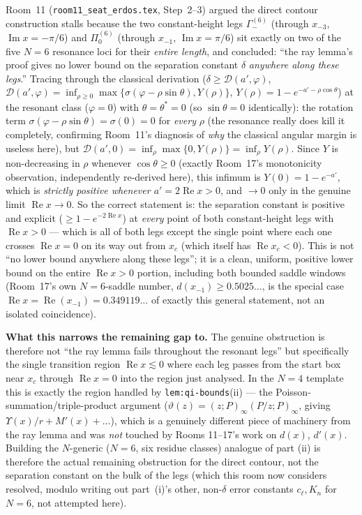 \documentclass[11pt]{article}
\begin{document}
Room~11 (\texttt{room11\_seat\_erdos.tex}, Step~2--3) argued the direct contour construction stalls
because the two constant-height legs $\Gamma_-^{(6)}$ (through $x_{-3}$, $\operatorname{Im}x=
-\pi/6$) and $\Pi_0^{(6)}$ (through $x_{-1}$, $\operatorname{Im}x=\pi/6$) sit exactly on two of the
five $N=6$ resonance loci for their \emph{entire length}, and concluded: ``the ray lemma's proof
gives no lower bound on the separation constant $\delta$ \emph{anywhere along these legs}.'' Tracing
through the classical derivation ($\delta\ge\mathcal D(a',\varphi)$, $\mathcal
D(a',\varphi)=\inf_{\rho\ge0}\max\{\sigma(\varphi-\rho\sin\theta),Y(\rho)\}$,
$Y(\rho)=1-e^{-a'-\rho\cos\theta}$) at the resonant class ($\varphi=0$) with $\theta=\theta^\ast=0$
(so $\sin\theta=0$ identically): the rotation term $\sigma(\varphi-\rho\sin\theta)=\sigma(0)=0$ for
\emph{every} $\rho$ (the resonance really does kill it completely, confirming Room~11's diagnosis of
\emph{why} the classical angular margin is useless here), but $\mathcal D(a',0)=\inf_\rho\max\{0,
Y(\rho)\}=\inf_\rho Y(\rho)$. Since $Y$ is non-decreasing in $\rho$ whenever $\cos\theta\ge0$
(exactly Room~17's monotonicity observation, independently re-derived here), this infimum is
$Y(0)=1-e^{-a'}$, which is \emph{strictly positive whenever $a'=2\operatorname{Re}x>0$}, and $\to0$
only in the genuine limit $\operatorname{Re}x\to0$. So the correct statement is: the separation
constant is positive and explicit ($\ge1-e^{-2\operatorname{Re}x}$) at \emph{every} point of both
constant-height legs with $\operatorname{Re}x>0$ --- which is all of both legs except the single
point where each one crosses $\operatorname{Re}x=0$ on its way out from $x_c$ (which itself has
$\operatorname{Re}x_c<0$). This is not ``no lower bound anywhere along these legs''; it is a clean,
uniform, positive lower bound on the entire $\operatorname{Re}x>0$ portion, including both bounded
saddle windows (Room~17's own $N=6$-saddle number, $d(x_{-1})\ge0.5025\ldots$, is the special case
$\operatorname{Re}x=\operatorname{Re}(x_{-1})=0.349119\ldots$ of exactly this general statement, not
an isolated coincidence).

\textbf{What this narrows the remaining gap to.} The genuine obstruction is therefore not ``the ray
lemma fails throughout the resonant legs'' but specifically the single transition region
$\operatorname{Re}x\lesssim0$ where each leg passes from the start box near $x_c$ through
$\operatorname{Re}x=0$ into the region just analysed. In the $N=4$ template this is exactly the
region handled by \texttt{lem:qi-bounds}(ii) --- the Poisson-summation/triple-product argument
($\vartheta(z)=(z;P)_\infty(P/z;P)_\infty$, giving $\Upsilon(x)/r+M'(x)+\ldots$), which is a
genuinely different piece of machinery from the ray lemma and was \emph{not} touched by Rooms
11--17's work on $d(x)$, $d'(x)$. Building the $N$-generic ($N=6$, six residue classes) analogue of
part (ii) is therefore the actual remaining obstruction for the direct contour, not the separation
constant on the bulk of the legs (which this room now considers resolved, modulo writing out
part~(i)'s other, non-$\delta$ error constants $c_\ell,K_n$ for $N=6$, not attempted here).
\end{document}
